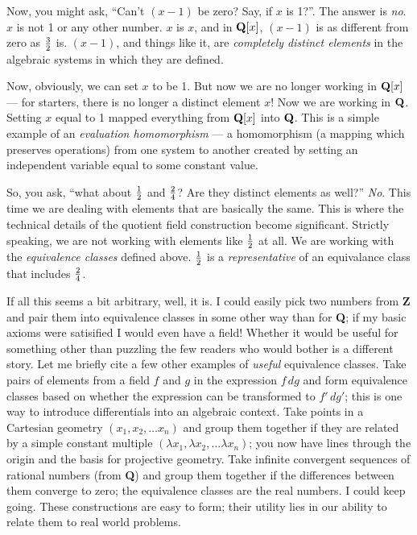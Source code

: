 Now, you might ask, ``Can't $(x-1)$ be zero?  Say, if $x$ is 1?''.
The answer is {\it no}.  $x$ is not 1 or any other number.  $x$ is
$x$, and in ${\bf Q}[x]$, $(x-1)$ is as different from zero as $3
\over 2$ is.  $(x-1)$, and things like it, are {\it
completely distinct elements} in the algebraic systems in which they
are defined.

Now, obviously, we can set $x$ to be 1.  But now we are no longer
working in ${\bf Q}[x]$ --- for starters, there is no longer a
distinct element $x$!  Now we are working in ${\bf Q}$.  Setting $x$
equal to 1 mapped everything from ${\bf Q}[x]$ into ${\bf Q}$.  This
is a simple example of an {\it evaluation homomorphism} --- a
homomorphism (a mapping which preserves operations) from one system to
another created by setting an independent variable equal to some
constant value.

So, you ask, ``what about $1\over2$ and $2\over4$?  Are they distinct
elements as well?''  {\it No}.  This time we are dealing with elements
that are basically the same. This is where the technical details of
the quotient field construction become significant.  Strictly
speaking, we are not working with elements like $1\over2$ at all.  We
are working with the {\it equivalence classes} defined above.
$1\over2$ is a {\it representative} of an equivalance class that
includes $2\over4$.

If all this seems a bit arbitrary, well, it is.  I could easily pick
two numbers from {\bf Z} and pair them into equivalence classes in
some other way than for {\bf Q}; if my basic axioms were satisified I
would even have a field!  Whether it would be useful for something
other than puzzling the few readers who would bother is a different
story.  Let me briefly cite a few other examples of {\it useful}
equivalence classes.  Take pairs of elements from a field $f$ and $g$
in the expression $f\,dg$ and form equivalence classes based on
whether the expression can be transformed to $f'\,dg'$; this is one
way to introduce differentials into an algebraic context.  Take points
in a Cartesian geometry $(x_1, x_2,\ldots x_n)$ and group them
together if they are related by a simple constant multiple $(\lambda
x_1, \lambda x_2,\ldots \lambda x_n)$; you now have lines through the
origin and the basis for projective geometry.  Take infinite
convergent sequences of rational numbers (from {\bf Q}) and group them
together if the differences between them converge to zero; the
equivalence classes are the real numbers.  I could keep going.  These
constructions are easy to form; their utility lies in our ability to
relate them to real world problems.

